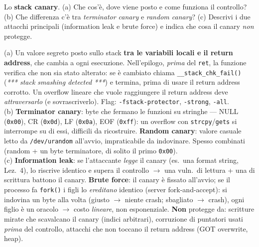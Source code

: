 \question[7]
Lo \textbf{stack canary}. (a) Che cos'è, dove viene posto e come funziona il controllo? (b) Che differenza c'è tra \emph{terminator canary} e \emph{random canary}? (c) Descrivi i due attacchi principali (information leak e brute force) e indica che cosa il canary \emph{non} protegge.
\begin{solution}
(a) Un valore segreto posto sullo stack \textbf{tra le variabili locali e il return address}, che cambia a ogni esecuzione. Nell'epilogo, \emph{prima} del \lstinline|ret|, la funzione verifica che non sia stato alterato: se è cambiato chiama \lstinline|__stack_chk_fail()| (\emph{*** stack smashing detected ***}) e termina, prima di usare il return address corrotto. Un overflow lineare che vuole raggiungere il return address deve \emph{attraversarlo} (e sovrascriverlo). Flag: \lstinline|-fstack-protector|, \lstinline|-strong|, \lstinline|-all|.\\
(b) \textbf{Terminator canary}: byte che fermano le funzioni su stringhe --- NULL (\lstinline|0x00|), CR (\lstinline|0x0d|), LF (\lstinline|0x0a|), EOF (\lstinline|0xff|): un overflow con \lstinline|strcpy|/\lstinline|gets| si interrompe su di essi, difficili da ricostruire. \textbf{Random canary}: valore casuale letto da \lstinline|/dev/urandom| all'avvio, impraticabile da indovinare. Spesso combinati (random + un byte terminatore, di solito il primo \lstinline|0x00|).\\
(c) \textbf{Information leak}: se l'attaccante \emph{legge} il canary (es.\ una format string, Lez.\ 4), lo riscrive identico e supera il controllo $\to$ una vuln.\ di lettura + una di scrittura battono il canary. \textbf{Brute force}: il canary è fissato all'avvio; se il processo fa \lstinline|fork()| i figli lo \emph{ereditano} identico (server fork-and-accept): si indovina un byte alla volta (giusto $\to$ niente crash; sbagliato $\to$ crash), ogni figlio è un oracolo $\to$ costo \emph{lineare}, non esponenziale. \textbf{Non} protegge da: scritture mirate che scavalcano il canary (indici arbitrari), corruzione di puntatori usati \emph{prima} del controllo, attacchi che non toccano il return address (GOT overwrite, heap).
\end{solution}
